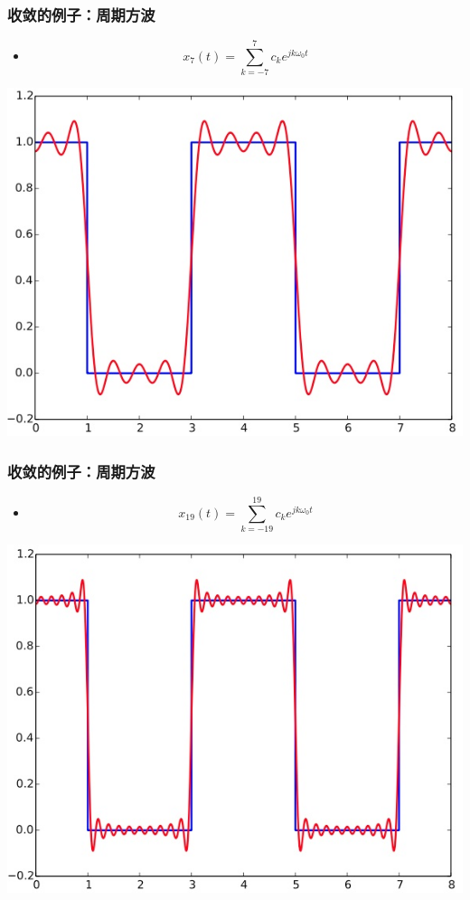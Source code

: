 \documentclass[CJKutf8,xcolor=pdftex,dvipsnames,table]{beamer}
\begin{document}
\begin{CJK*}{UTF8}{song}
  \begin{frame}
    \frametitle{收敛的例子：周期方波}
    \begin{itemize}
    \item \[ x_{7}(t)=\sum_{k=-7}^{7}c_k e^{jk\omega_0 t} \]
    \end{itemize}
    \begin{center}
      \includegraphics[scale=.4]{ss-c-f3-9c}
    \end{center}
  \end{frame}  
        
  \begin{frame}
    \frametitle{收敛的例子：周期方波}
    \begin{itemize}
    \item \[ x_{19}(t)=\sum_{k=-19}^{19}c_k e^{jk\omega_0 t} \]
    \end{itemize}
    \begin{center}
      \includegraphics[scale=.4]{ss-c-f3-9d}
    \end{center}
  \end{frame}  
  

\end{CJK*}
\end{document}
